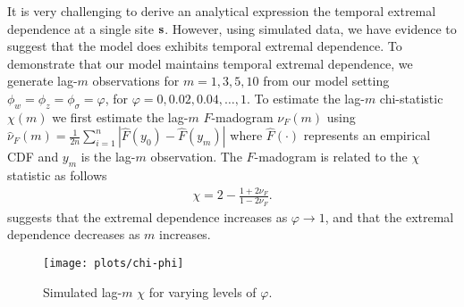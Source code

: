 It is very challenging to derive an analytical expression the temporal extremal dependence at a single site $\mathbf{s}$.
However, using simulated data, we have evidence to suggest that the model does exhibits temporal extremal dependence.
To demonstrate that our model maintains temporal extremal dependence, we generate lag-$m$ observations for $m = 1, 3, 5, 10$ from our model setting $\phi_w = \phi_z = \phi_\sigma = \varphi$, for $\varphi = 0, 0.02, 0.04, \ldots, 1$.
To estimate the lag-$m$ chi-statistic $\chi(m)$ we first estimate the lag-$m$ $F$-madogram $\nu_F(m)$ \citep{Cooley2006} using $\hat{\nu}_F(m) = \displaystyle \frac{1}{2n} \sum_{i = 1}^n \left| \hat{F}(y_{0}) - \hat{F}(y_{m}) \right|$ where $\hat{F}(\cdot)$ represents an empirical CDF and $y_m$ is the lag-$m$ observation.
The $F$-madogram is related to the $\chi$ statistic as follows
\begin{align}
  \chi = 2 - \frac{1 + 2 \nu_F}{1 - 2 \nu_F}.
\end{align}
 suggests that the extremal dependence increases as $\varphi \rightarrow 1$, and that the extremal dependence decreases as $m$ increases.
\begin{figure}
  \centering
  \texttt{[image: plots/chi-phi]}
  \caption{Simulated lag-$m$ $\chi$ for varying levels of $\varphi$.}
  \label{stfig:chiphi}
\end{figure}


